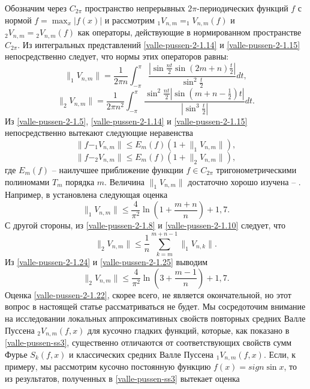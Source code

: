 Обозначим через $C_{2\pi}$ пространство непрерывных $2\pi$-периодических функций $f$  с нормой $f=\max_x|f(x)|$ и рассмотрим $_1V_{n,m}=_1V_{n,m}(f)$ и $_2V_{n,m}={}_2V_{n,m}(f)$
как операторы, действующие в нормированном пространстве $C_{2\pi}$. Из интегральных представлений \eqref{valle-pussen-2-1.14} и \eqref{valle-pussen-2-1.15} непосредственно следует, что нормы этих операторов равны:
\begin{equation}\label{valle-pussen-2-1.20}
\|_1V_{n,m}\|=\frac{1}{2\pi n}\int_{-\pi}^\pi \frac{|\sin\frac{nt}{2}\sin(2m+n)\frac{t}{2}|}{\sin^2\frac{t}{2}}dt,
 \end{equation}
\begin{equation}\label{valle-pussen-2-1.21}
\|_2V_{n,m}\|=\frac{1}{2\pi n^2}\int_{-\pi}^\pi  \frac{\sin^2\frac{nt}{2}|\sin(m+n-\frac12)t|}{|\sin^3\frac{t}{2}|}dt.
 \end{equation}
Из \eqref{valle-pussen-2-1.5}, \eqref{valle-pussen-2-1.14}  и \eqref{valle-pussen-2-1.15} непосредственно вытекают следующие неравенства
\begin{equation}\label{valle-pussen-2-1.22}
\|f-_1V_{n,m}\|\le E_m(f)(1+\|_1V_{n,m}\|),
 \end{equation}
\begin{equation}\label{valle-pussen-2-1.23}
\|f-_2V_{n,m}\|\le E_m(f)(1+\|_2V_{n,m}\|),
 \end{equation}
где $E_m(f)$ -- наилучшее приближение функции $f\in C_{2\pi}$ тригонометрическими полиномами $T_m$ порядка $m$. Величина $\|_1V_{n,m}\|$ достаточно хорошо изучена \cite{valle-pussen-2-NIK} -- \cite{valle-pussen-2-Zhuk}. Например, в \cite{valle-pussen-2-Zhuk} установлена следующая оценка
\begin{equation}\label{valle-pussen-2-1.24}
\|_1V_{n,m}\|\le \frac{4}{\pi^2}\ln\left(1+\frac{m+n}{n}\right)+1,7.
 \end{equation}
С другой стороны, из \eqref{valle-pussen-2-1.8} и \eqref{valle-pussen-2-1.10} следует, что
\begin{equation}\label{valle-pussen-2-1.25}
\|_2V_{n,m}\|\le \frac1n\sum_{k=m}^{m+n-1}\|_1V_{n,k}\|.
 \end{equation}
Из \eqref{valle-pussen-2-1.24} и \eqref{valle-pussen-2-1.25} выводим
\begin{equation}\label{valle-pussen-2-1.22}
\|_2V_{n,m}\|\le \frac{4}{\pi^2}\ln\left(3+\frac{m-1}{n}\right)+1,7.
 \end{equation}
 Оценка \eqref{valle-pussen-2-1.22}, скорее всего, не является окончательной, но этот вопрос в настоящей статье рассматриваться не будет. Мы сосредоточим внимание на исследовании локальных аппроксимативных свойств повторных средних Валле Пуссена $_2V_{n,m}(f,x)$ для кусочно гладких функций, которые, как показано в \ref{valle-pussen-ss3}, существенно отличаются от соответствующих свойств  сумм Фурье $S_k(f,x)$ и классических средних Валле Пуссена $_1V_{n,m}(f,x)$. Если, к примеру, мы рассмотрим кусочно постоянную функцию $f(x)=sign\sin x$, то из результатов, полученных в \ref{valle-pussen-ss3} вытекает оценка
